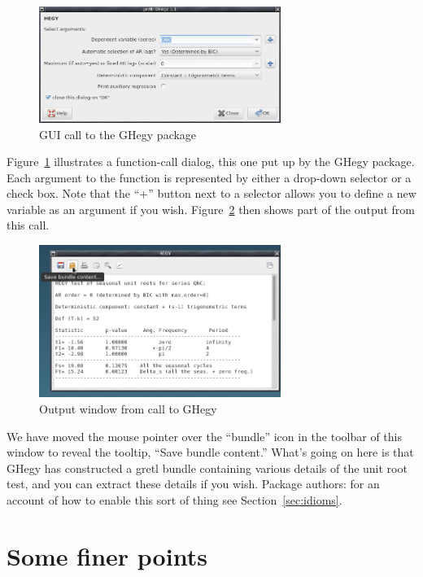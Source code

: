 \documentclass[oneside]{book}
\begin{document}
\begin{figure}[htbp]
  \centering
  \includegraphics[width=0.7\textwidth]{figures/ghegy-call}
  \caption{GUI call to the \textsf{GHegy} package}
  \label{fig:ghegy-call}
\end{figure}

Figure~\ref{fig:ghegy-call} illustrates a function-call dialog, this
one put up by the \textsf{GHegy} package. Each argument to the
function is represented by either a drop-down selector or a check
box. Note that the ``\textsf{+}'' button next to a selector allows you
to define a new variable as an argument if you
wish. Figure~\ref{fig:ghegy-output} then shows part of the output from
this call.

\begin{figure}[htbp]
  \centering
  \includegraphics[width=0.7\textwidth]{figures/ghegy-output}
  \caption{Output window from call to \textsf{GHegy}}
  \label{fig:ghegy-output}
\end{figure}

We have moved the mouse pointer over the ``bundle'' icon in the
toolbar of this window to reveal the tooltip, ``Save bundle content.''
What's going on here is that \textsf{GHegy} has constructed a gretl
bundle containing various details of the unit root test, and you can
extract these details if you wish. Package authors: for an account of
how to enable this sort of thing see Section~\ref{sec:idioms}.


\section{Some finer points}
\label{sec:finer}
\end{document}
